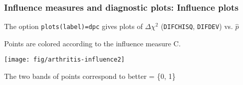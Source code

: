\begin{frame}
  \frametitle{Influence measures and diagnostic plots: Influence plots}
The option \alert{\texttt{plots(label)=dpc}} gives plots of $\Delta \chi^2$ (\texttt{DIFCHISQ}, \texttt{DIFDEV}) vs. $\widehat{p}$

Points are colored according to the influence measure C.
 \begin{center}
\texttt{[image: fig/arthritis-influence2]}
 \end{center}
The two bands of points correspond to better = \{0, 1\}
\end{frame}
